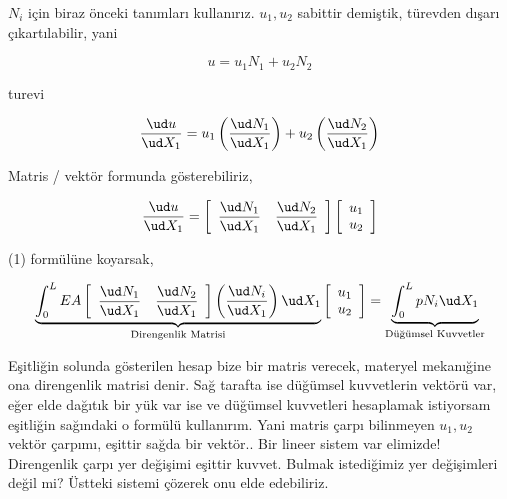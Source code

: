 $N_i$ için biraz önceki tanımları kullanırız. $u_1,u_2$ sabittir demiştik,
türevden dışarı çıkartılabilir, yani

$$
u = u_1 N_1 + u_2 N_2
$$

turevi

$$
\frac{\ud u}{\ud X_1} = u_1 \left( \frac{\ud N_1}{\ud X_1}  \right) +
u_2 \left( \frac{\ud N_2}{\ud X_1}  \right)
$$

Matris / vektör formunda gösterebiliriz,

$$
\frac{\ud u}{\ud X_1} = \left[\begin{array}{cc}
\dfrac{\ud N_1}{\ud X_1} & \dfrac{\ud N_2}{\ud X_1} 
\end{array}\right]
\left[\begin{array}{c}
u_1 \\ u_2
\end{array}\right]
$$

(1) formülüne koyarsak,

$$
\underbrace{
  \int_{0}^{L} EA
  \left[\begin{array}{cc}
  \dfrac{\ud N_1}{\ud X_1} & \dfrac{\ud N_2}{\ud X_1} 
  \end{array}\right]
  \left( \frac{\ud N_i}{\ud X_1}  \right) \ud X_1
}_{\textrm{Direngenlik Matrisi}}
\left[\begin{array}{c} u_1 \\ u_2 \end{array}\right] =
\underbrace{
  \int_{0}^{L} p N_i \ud X_1
}_{\textrm{Düğümsel Kuvvetler}}
$$

Eşitliğin solunda gösterilen hesap bize bir matris verecek, materyel mekanığine
ona direngenlik matrisi denir. Sağ tarafta ise düğümsel kuvvetlerin vektörü var,
eğer elde dağıtık bir yük var ise ve düğümsel kuvvetleri hesaplamak istiyorsam
eşitliğin sağındaki o formülü kullanırım. Yani matris çarpı bilinmeyen $u_1,u_2$
vektör çarpımı, eşittir sağda bir vektör.. Bir lineer sistem var elimizde!
Direngenlik çarpı yer değişimi eşittir kuvvet. Bulmak istediğimiz yer
değişimleri değil mi? Üstteki sistemi çözerek onu elde edebiliriz.
